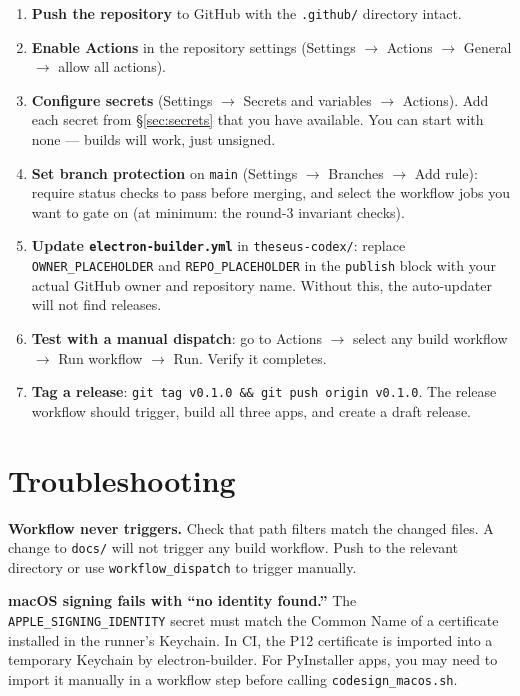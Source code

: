 \documentclass[11pt,letterpaper]{article}
\newcommand{\file}[1]{\texttt{#1}}
\newcommand{\cmd}[1]{\texttt{#1}}
\begin{document}
\begin{enumerate}[leftmargin=1.5em,itemsep=0.2em]
  \item \textbf{Push the repository} to GitHub with the \file{.github/} directory intact.
  \item \textbf{Enable Actions} in the repository settings (Settings $\to$ Actions $\to$ General $\to$ allow all actions).
  \item \textbf{Configure secrets} (Settings $\to$ Secrets and variables $\to$ Actions). Add each secret from \S\ref{sec:secrets} that you have available. You can start with none --- builds will work, just unsigned.
  \item \textbf{Set branch protection} on \cmd{main} (Settings $\to$ Branches $\to$ Add rule): require status checks to pass before merging, and select the workflow jobs you want to gate on (at minimum: the round-3 invariant checks).
  \item \textbf{Update \file{electron-builder.yml}} in \file{theseus-codex/}: replace \cmd{OWNER\_PLACEHOLDER} and \cmd{REPO\_PLACEHOLDER} in the \cmd{publish} block with your actual GitHub owner and repository name. Without this, the auto-updater will not find releases.
  \item \textbf{Test with a manual dispatch}: go to Actions $\to$ select any build workflow $\to$ Run workflow $\to$ Run. Verify it completes.
  \item \textbf{Tag a release}: \cmd{git tag v0.1.0 \&\& git push origin v0.1.0}. The release workflow should trigger, build all three apps, and create a draft release.
\end{enumerate}

\section{Troubleshooting}

\textbf{Workflow never triggers.} Check that path filters match the changed files. A change to \file{docs/} will not trigger any build workflow. Push to the relevant directory or use \cmd{workflow\_dispatch} to trigger manually.

\textbf{macOS signing fails with ``no identity found.''} The \cmd{APPLE\_SIGNING\_IDENTITY} secret must match the Common Name of a certificate installed in the runner's Keychain. In CI, the P12 certificate is imported into a temporary Keychain by electron-builder. For PyInstaller apps, you may need to import it manually in a workflow step before calling \file{codesign\_macos.sh}.
\end{document}
